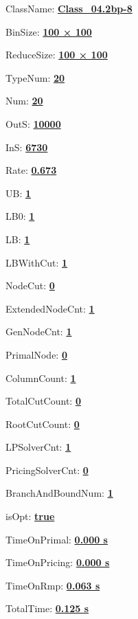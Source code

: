 \documentclass[11pt]{article}
\begin{document}
\pagestyle{empty}


ClassName: \underline{\textbf{Class_04.2bp-8}}
\par
BinSize: \underline{\textbf{100 × 100}}
\par
ReduceSize: \underline{\textbf{100 × 100}}
\par
TypeNum: \underline{\textbf{20}}
\par
Num: \underline{\textbf{20}}
\par
OutS: \underline{\textbf{10000}}
\par
InS: \underline{\textbf{6730}}
\par
Rate: \underline{\textbf{0.673}}
\par
UB: \underline{\textbf{1}}
\par
LB0: \underline{\textbf{1}}
\par
LB: \underline{\textbf{1}}
\par
LBWithCut: \underline{\textbf{1}}
\par
NodeCut: \underline{\textbf{0}}
\par
ExtendedNodeCnt: \underline{\textbf{1}}
\par
GenNodeCnt: \underline{\textbf{1}}
\par
PrimalNode: \underline{\textbf{0}}
\par
ColumnCount: \underline{\textbf{1}}
\par
TotalCutCount: \underline{\textbf{0}}
\par
RootCutCount: \underline{\textbf{0}}
\par
LPSolverCnt: \underline{\textbf{1}}
\par
PricingSolverCnt: \underline{\textbf{0}}
\par
BranchAndBoundNum: \underline{\textbf{1}}
\par
isOpt: \underline{\textbf{true}}
\par
TimeOnPrimal: \underline{\textbf{0.000 s}}
\par
TimeOnPricing: \underline{\textbf{0.000 s}}
\par
TimeOnRmp: \underline{\textbf{0.063 s}}
\par
TotalTime: \underline{\textbf{0.125 s}}
\par
\newpage
\end{document}
